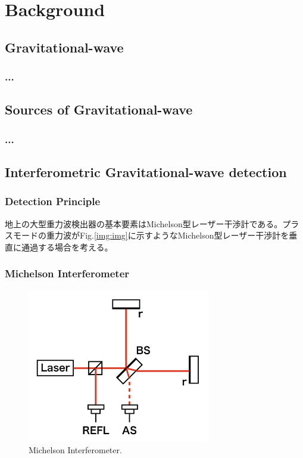 \chapter{Background}
\section{Gravitational-wave}
\subsection{...}
\section{Sources of Gravitational-wave}
\subsection{...}
\section{Interferometric Gravitational-wave detection} \label{sec:13}

\subsection{Detection Principle}
地上の大型重力波検出器の基本要素はMichelson型レーザー干渉計である。プラスモードの重力波がFig.\ref{img:img}に示すようなMichelson型レーザー干渉計を垂直に通過する場合を考える。

\subsection{Michelson Interferometer}
\begin{figure}[H]
  \begin{center}   
    \includegraphics[width=8.0cm]{./img_chap1/img132.png}
    \caption{Michelson Interferometer. }\label{img:img132}
  \end{center}
\end{figure}

